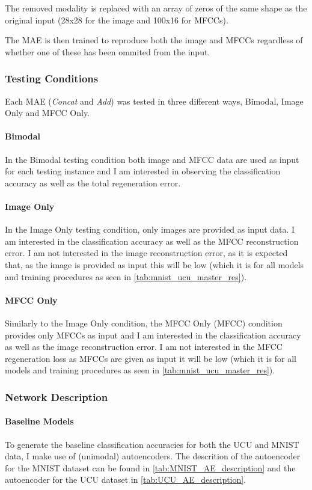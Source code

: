 The removed modality is replaced with an array of zeros of the same shape as the original input (28x28 for the image and 100x16 for MFCCs).

The MAE is then trained to reproduce both the image and MFCCs regardless of whether one of these has been ommited from the input.

\subsubsection{Testing Conditions}
Each MAE (\textit{Concat} and \textit{Add}) was tested in three different ways, Bimodal, Image Only and MFCC Only.

\paragraph{Bimodal}
In the Bimodal testing condition both image and MFCC data are used as input for each testing instance and I am interested in observing the classification accuracy as well as the total regeneration error.

\paragraph{Image Only}
In the Image Only testing condition, only images are provided as input data. I am interested in the classification accuracy as well as the MFCC reconstruction error. I am not interested in the image reconstruction error, as it is expected that, as the image is provided as input this will be low (which it is for all models and training procedures as seen in \autoref{tab:mnist_ucu_master_res}).  

\paragraph{MFCC Only}
Similarly to the Image Only condition, the MFCC Only (MFCC) condition provides only MFCCs as input and I am interested in the classification accuracy as well as the image reconstruction error. I am not interested in the MFCC regeneration loss as MFCCs are given as input it will be low (which it is for all models and training procedures as seen in \autoref{tab:mnist_ucu_master_res}).  

\subsubsection{Network Description}
\paragraph{Baseline Models}
To generate the baseline classification accuracies for both the UCU and MNIST data, I make use of (unimodal) autoencoders. The descrition of the autoencoder for the MNIST dataset can be found in \autoref{tab:MNIST_AE_description} and the autoencoder for the UCU dataset in \autoref{tab:UCU_AE_description}.

